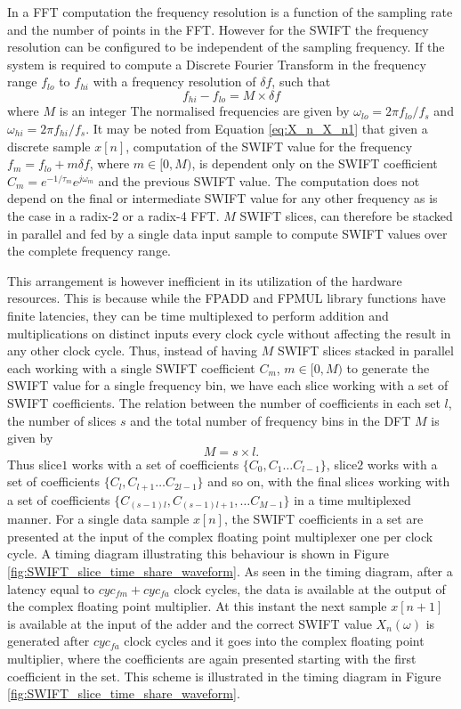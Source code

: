 In a FFT computation the frequency resolution is a function of the sampling rate and the number of points in the FFT. However for the SWIFT the frequency resolution can be configured to be independent of the sampling frequency. If the system is required to compute a Discrete Fourier Transform in the frequency range $f_{lo}$ to $f_{hi}$ with a frequency resolution of $\delta f$, such that
\begin{equation}
f_{hi} - f_{lo} = M \times \delta f
\end{equation}
where $M$ is an integer
The normalised frequencies are given by $\omega_{lo}  = 2\pi f_{lo}/f_s$ and $\omega_{hi} = 2\pi f_{hi}/f_s$. 
It may be noted from Equation \ref{eq:X_n_X_n1} that given a discrete sample $x[n]$, computation of the SWIFT value for the frequency $f_m = f_{lo} + m\delta f$, where $m \in [0,M)$, is dependent only on the SWIFT coefficient $C_m = e^{-1/\tau_m} e^{j\omega_m}$ and the previous SWIFT value. The computation does not depend on the final or intermediate SWIFT value for any other frequency as is the case in a radix-2 or a radix-4 FFT. $M$ SWIFT slices, can therefore be stacked in parallel and fed by a single data input sample to compute SWIFT values over the complete frequency range. 

This arrangement is however inefficient in its utilization of the hardware resources. This is because while the FPADD and FPMUL library functions have finite latencies, they can be time multiplexed to perform addition and multiplications on distinct inputs every clock cycle without affecting the result in any other clock cycle. 
Thus, instead of having $M$ SWIFT slices stacked in parallel each working with a single SWIFT coefficient $C_m$, $m \in [0,M)$ to generate the SWIFT value for a single frequency bin, we have each slice working with a set of SWIFT coefficients. The relation between the number of coefficients in each set $l$, the number of slices $s$ and the total number of frequency bins in the DFT $M$ is given by 
\begin{equation}
\label{eq:tdm_slices}
M = s \times l.
\end{equation}
Thus slice$1$ works with a set of coefficients $\{C_0, C_1 \ldots C_{l-1}\}$, slice$2$ works with a set of coefficients $\{C_l, C_{l+1} \ldots C_{2l-1}\}$ and so on, with the final slice$s$ working with a set of coefficients $\{C_{(s-1)l}, C_{(s-1)l+1}, \ldots C_{M-1}\}$ in a time multiplexed manner. 
For a single data sample $x[n]$, the SWIFT coefficients in a set are presented at the input of the complex floating point multiplexer one per clock cycle. A timing diagram illustrating this behaviour is shown in Figure \ref{fig:SWIFT_slice_time_share_waveform}. As seen in the timing diagram, after a latency equal to $cyc_{fm} + cyc_{fa}$ clock cycles, the data is available at the output of the complex floating point multiplier. At this instant the next sample $x[n+1]$ is available at the input of the adder and the correct SWIFT value $X_n(\omega)$ is generated after $cyc_{fa}$ clock cycles and it goes into the complex floating point multiplier, where the coefficients are again presented starting with the first coefficient in the set. This scheme is illustrated in the timing diagram in Figure \ref{fig:SWIFT_slice_time_share_waveform}.


